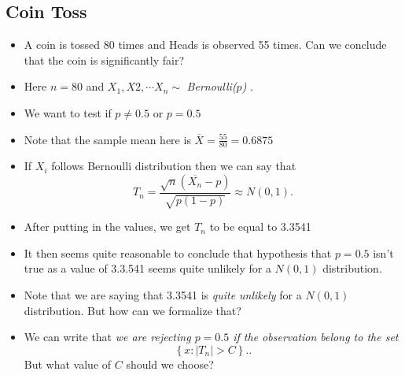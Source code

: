 \documentclass[a4paper]{article}
\begin{document}
\subsection{Coin Toss}
\begin{itemize}
	\item{A coin is tossed 80 times and Heads is observed 55 times. Can we conclude that the coin is significantly fair?}
	\item{Here $n = 80$ and $ X_1, X2, \cdots X_n \sim $ \textit{Bernoulli($p$)} .}
	\item{We want to test if $p\neq 0.5$ or $p = 0.5$}
	\item{Note that the sample mean here is $\overline{X} = \frac{55}{80} = 0.6875$}
	\item{If $X_i$ follows Bernoulli distribution then we can say that 
		\[
		T_n = \frac{\sqrt{n}\left( \overline{X_n}- p \right) } {\sqrt{p\left( 1-p \right) } } \approx	N(0,1) 
		.\] }
	\item{After putting in the values, we get $T_n$ to be equal to 3.3541}
	\item{It then seems quite reasonable to conclude that hypothesis that $p = 0.5$ isn't true as a value of 3.3.541 seems quite unlikely for a $N(0,1)$ distribution.}
	\item{Note that we are saying that 3.3541 is \textit{quite unlikely} for a $N(0,1)$ distribution. But how can we formalize that?}
	\item{We can write that \textit{we are rejecting $p = 0.5$ if the observation belong to the set}
		\[
			\left\{ x :  \mid T_n \mid > C \right\}. 
	.\] But what value of $C$ should we choose?}

\end{itemize}
\end{document}
